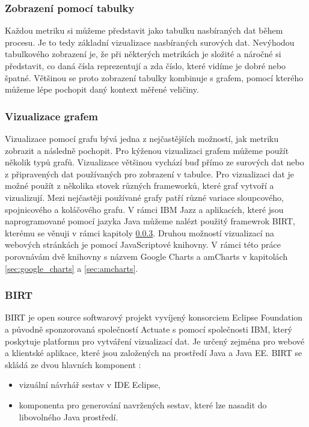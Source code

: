 \documentclass[czech,master,public,dept460,male,cpdeclaration,oneside]{diploma}
\begin{document}

\subsubsection{Zobrazení pomocí tabulky}
Každou metriku si můžeme představit jako tabulku nasbíraných dat během procesu. Je to tedy základní vizualizace nasbíraných surových dat. Nevýhodou tabulkového zobrazení je, že při některých metrikách je složité a náročné si představit, co daná čísla reprezentují a zda číslo, které vidíme je dobré nebo špatné. Většinou se proto zobrazení tabulky kombinuje s grafem, pomocí kterého můžeme lépe pochopit daný kontext měřené veličiny.

\subsubsection{Vizualizace grafem}
Vizualizace pomocí grafu bývá jedna z nejčastějších možností, jak metriku zobrazit a následně pochopit. Pro kýženou vizualizaci grafem můžeme použít několik typů grafů. Vizualizace většinou vychází buď přímo ze surových dat nebo z připravených dat používaných pro zobrazení v tabulce. Pro vizualizaci dat je možné použít z několika stovek různých frameworků, které graf vytvoří a vizualizují. Mezi nejčastěji používané grafy patří různé variace sloupcového, spojnicového a koláčového grafu. V rámci IBM Jazz a aplikacích, které jsou naprogramované pomocí jazyka Java můžeme nalézt použitý framewrok BIRT, kterému se věnuji v rámci kapitoly \ref{sec:birt}. Druhou možností vizualizací na webových stránkách je pomocí JavaScriptové knihovny. V rámci této práce porovnávám dvě knihovny s názvem Google Charts a amCharts v kapitolách \ref{sec:google_charts} a \ref{sec:amcharts}.

\subsubsection{BIRT}
\label{sec:birt}
BIRT je open source softwarový projekt vyvíjený konsorciem Eclipse Foundation a původně sponzorovaná společností Actuate s pomocí společnosti IBM, který poskytuje platformu pro vytváření vizualizací dat. Je určený zejména pro webové a klientské aplikace, které jsou založených na prostředí Java a Java EE. BIRT se skládá ze dvou hlavních komponent \cite{ref:birt_about}:

\begin{itemize}
\item vizuální návrhář sestav v IDE Eclipse,
\item komponenta pro generování navržených sestav, které lze nasadit do libovolného Java prostředí.
\end{itemize}
\end{document}
